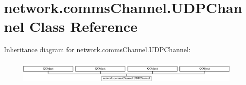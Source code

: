 \hypertarget{classnetwork_1_1commsChannel_1_1UDPChannel}{}\section{network.\+comms\+Channel.\+U\+D\+P\+Channel Class Reference}
\label{classnetwork_1_1commsChannel_1_1UDPChannel}
Inheritance diagram for network.\+comms\+Channel.\+U\+D\+P\+Channel\+:\begin{figure}[H]
\begin{center}
\leavevmode
\includegraphics[height=1.222707cm]{classnetwork_1_1commsChannel_1_1UDPChannel}
\end{center}
\end{figure}

